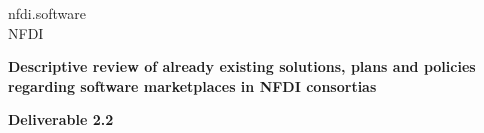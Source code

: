 \documentclass[headsepline,titlepage,twoside,12pt]{report}
\author{Vorname Name}
\begin{document}
\allowdisplaybreaks%

\begin{titlepage}
\thispagestyle{empty}
\begin{center}

{\large nfdi.software\\[1mm]}
NFDI\\

\vspace{2cm}

{\large\textbf{Descriptive review of already existing solutions, plans and policies regarding software marketplaces in NFDI consortias}}\\
\vspace*{4cm}


{\Huge\textbf{Deliverable 2.2}}\\

\end{center}
\end{titlepage}

\tableofcontents

\begin{table}

\end{table}
\begin{table}

\end{table}
\begin{table}

\end{table}
\end{document}

